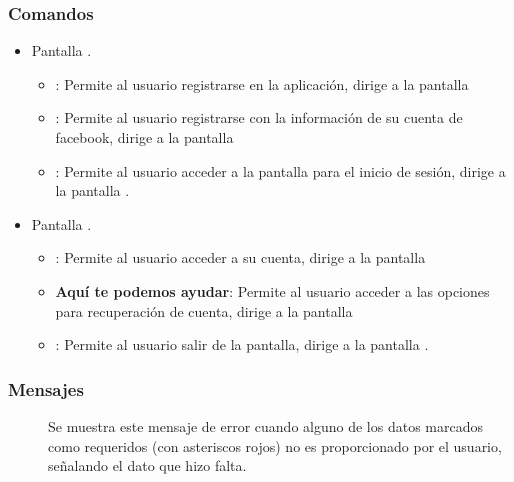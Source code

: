 \subsubsection{Comandos}
    \begin{itemize}
    	
    	\item Pantalla .
    	
    	\begin{itemize}
    		\item {}: Permite al usuario registrarse en la aplicación, dirige a la pantalla 
    		\item {}: Permite al usuario registrarse con la información de su cuenta de facebook, dirige a la pantalla
    		\item {}: Permite al usuario acceder a la pantalla para el inicio de sesión, dirige a la pantalla . 
    	\end{itemize}
    
		\item Pantalla .
		
		\begin{itemize}
			\item {}:  Permite al usuario acceder a su cuenta, dirige a la pantalla
			\item \textbf{Aquí te podemos ayudar}: Permite al usuario acceder a las opciones para recuperación de cuenta, dirige a la pantalla 
			\item \btnRegresar [Regresar]: Permite al usuario salir de la pantalla, dirige a la pantalla . 
		\end{itemize}
    \end{itemize}

\subsubsection{Mensajes}

    \begin{description}
		\item[] Se muestra este mensaje de error cuando alguno de los datos marcados como requeridos (con asteriscos rojos) no es proporcionado por el usuario, señalando el dato que hizo falta.
    \end{description}
